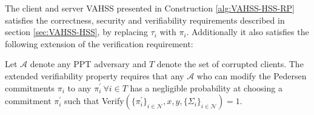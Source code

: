 \begin{thm}
\label{thm:VAHSS_RP_CSV}
\vspace{10pt}
The client and server VAHSS presented in Construction \ref{alg:VAHSS-HSS-RP} satisfies the correctness, security and verifiability requirements described in section \ref{sec:VAHSS-HSS}, by replacing $\tau_i$ with $\pi_i$. Additionally it also satisfies the following extension of the verification requirement:

Let $\mathcal{A}$ denote any PPT adversary and $T$ denote the set of corrupted clients. The extended verifiability property requires that any $\mathcal{A}$ who can modify the Pedersen commitments $\pi_i$  to any $\pi_i^{'} \:\forall  i\in T$ has a negligible probability at choosing a commitment $\pi_i^{'}$ such that Verify$( \{\pi^{'}_i\}_{i\in\mathcal{N}},x,y,\{\Sigma_i\}_{i\in\mathcal{N}})=1$.




\end{thm}
